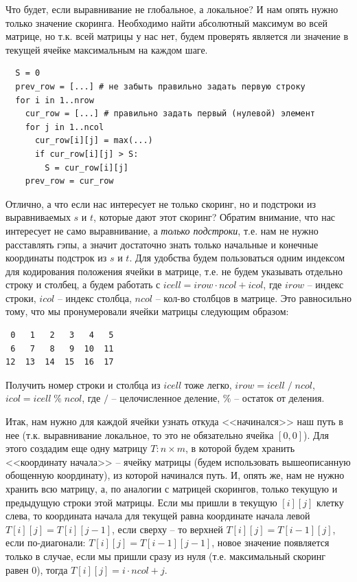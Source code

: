 \documentclass[letterpaper, 11pt]{article}
\begin{document}
Что будет, если выравнивание не глобальное, а локальное? И нам опять нужно только значение скоринга. Необходимо найти абсолютный максимум во всей матрице, но т.к. всей матрицы у нас нет, будем проверять является ли значение в текущей ячейке максимальным на каждом шаге.

\begin{verbatim}
  S = 0
  prev_row = [...] # не забыть правильно задать первую строку
  for i in 1..nrow
    cur_row = [...] # правильно задать первый (нулевой) элемент
    for j in 1..ncol
      cur_row[i][j] = max(...)
      if cur_row[i][j] > S:
        S = cur_row[i][j]
    prev_row = cur_row
\end{verbatim}

Отлично, а что если нас интересует не только скоринг, но и подстроки из выравниваемых $s$ и $t$, которые дают этот скоринг? Обратим внимание, что нас интересует не само выравнивание, а \textit{только подстроки}, т.е. нам не нужно расставлять гэпы, а значит достаточно знать только начальные и конечные координаты подстрок из $s$ и $t$. Для удобства будем пользоваться одним индексом для кодирования положения ячейки в матрице, т.е. не будем указывать отдельно строку и столбец, а будем работать с $icell = irow \cdot ncol + icol$, где $irow$ -- индекс строки, $icol$ -- индекс столбца, $ncol$ -- кол-во столбцов в матрице. Это равносильно тому, что мы пронумеровали ячейки матрицы следующим образом:

\begin{verbatim}
 0   1   2   3   4   5
 6   7   8   9  10  11
12  13  14  15  16  17
\end{verbatim}

Получить номер строки и столбца из $icell$ тоже легко, $irow = icell \; / \; ncol$, $icol = icell \; \% \; ncol$, где $/$ -- целочисленное деление, $\%$ -- остаток от деления.

Итак, нам нужно для каждой ячейки узнать откуда <<начинался>> наш путь в нее (т.к. выравнивание локальное, то это не обязательно ячейка $[0, 0]$). Для этого создадим еще одну матрицу $T : n \times m$, в которой будем хранить <<координату начала>> -- ячейку матрицы (будем использовать вышеописанную обощенную координату), из которой начинался путь. И, опять же, нам не нужно хранить всю матрицу, а, по аналогии с матрицей скорингов, только текущую и предыдущую строки этой матрицы. Если мы пришли в текущую $[i][j]$ клетку слева, то координата начала для текущей равна координате начала левой $T[i][j] = T[i][j - 1]$, если сверху -- то верхней $T[i][j] = T[i - 1][j]$, если по-диагонали: $T[i][j] = T[i - 1][j - 1]$, новое значение появляется только в случае, если мы пришли сразу из нуля (т.е. максимальный скоринг равен $0$), тогда $T[i][j] = i \cdot ncol + j$.
\end{document}
